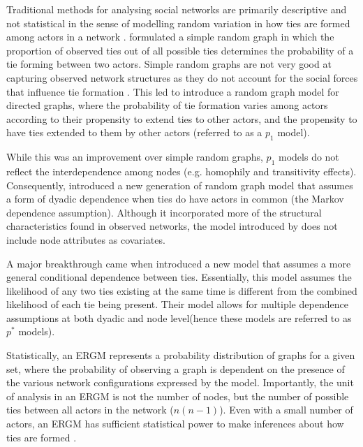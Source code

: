 Traditional methods for analysing social networks are primarily descriptive and not statistical in the sense of modelling random variation in how ties are formed among actors in a network \citep{harris2013introduction}. \citet{erdos1959random} formulated a simple random graph in which the proportion of observed ties out of all possible ties determines the probability of a tie forming between two actors. Simple random graphs are not very good at capturing observed network structures as they do not account for the social forces that influence tie formation \citep{harris2013introduction}. This led \citet{holland1981exponential} to introduce a random graph model for directed graphs, where the probability of tie formation varies among actors according to their propensity to extend ties to other actors, and the propensity to have ties extended to them by other actors (referred to as a $p_1$ model). \medskip

While this was an improvement over simple random graphs, $p_1$ models do not reflect the interdependence among nodes (e.g. homophily and transitivity effects). Consequently,  \citet{frank1986markov} introduced a new generation of random graph model that assumes a form of dyadic dependence when ties do have actors in common (the Markov dependence assumption). Although it incorporated more of the structural characteristics found in observed networks, the model introduced by \citet{frank1986markov} does not include node attributes as covariates. \medskip

A major breakthrough came when \citet{wasserman1996logit} introduced a new model that assumes a more general conditional dependence between ties. Essentially, this model assumes the likelihood of any two ties existing at the same time is different from the combined likelihood of each tie being present. Their model allows for multiple dependence assumptions at both dyadic and node level(hence these models are referred to as $p^*$ models). \medskip

Statistically, an ERGM represents a probability distribution of graphs for a given set, where the probability of observing a graph is dependent on the presence of the various network configurations expressed by the model. Importantly, the unit of analysis in an ERGM is not the number of nodes, but the number of possible ties between all actors in the network ($n(n-1)$). Even with a small number of actors, an ERGM has sufficient statistical power to make inferences about how ties are formed \citep{lusher2013exponential}. \medskip

